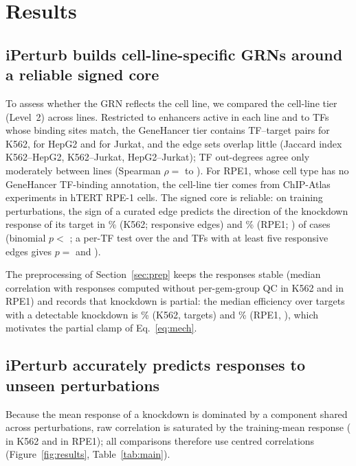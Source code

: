 \section{Results}
\label{sec:results}

\subsection{iPerturb builds cell-line-specific GRNs around a reliable signed core}
\label{sec:results_grn}
To assess whether the GRN reflects the cell line, we compared the cell-line tier (Level~2) across lines.
Restricted to enhancers active in each line and to TFs whose binding sites match, the GeneHancer tier contains  TF--target pairs for K562,  for HepG2 and  for Jurkat, and the edge sets overlap little (Jaccard index  K562--HepG2,  K562--Jurkat,  HepG2--Jurkat); TF out-degrees agree only moderately between lines (Spearman $\rho=$  to ).
For RPE1, whose cell type has no GeneHancer TF-binding annotation, the cell-line tier comes from ChIP-Atlas experiments in hTERT RPE-1 cells.
The signed core is reliable: on training perturbations, the sign of a curated edge predicts the direction of the knockdown response of its target in \% (K562;  responsive edges) and \% (RPE1; ) of cases (binomial $p<$ ; a per-TF test over the  and  TFs with at least five responsive edges gives $p=$  and ).

The preprocessing of Section~\ref{sec:prep} keeps the responses stable (median correlation with responses computed without per-gem-group QC  in K562 and  in RPE1) and records that knockdown is partial: the median efficiency over targets with a detectable knockdown is \% (K562,  targets) and \% (RPE1, ), which motivates the partial clamp of Eq.~\eqref{eq:mech}.

\subsection{iPerturb accurately predicts responses to unseen perturbations}
\label{sec:results_pred}
Because the mean response of a knockdown is dominated by a component shared across perturbations, raw correlation is saturated by the training-mean response ( in K562 and  in RPE1); all comparisons therefore use centred correlations (Figure~\ref{fig:results}, Table~\ref{tab:main}).

